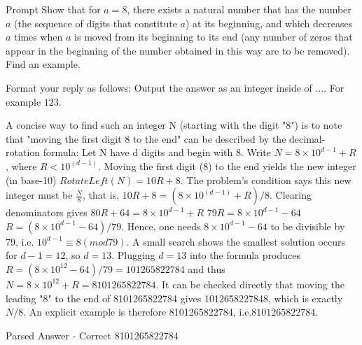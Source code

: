 
\begin{prompt}{Prompt}
Show that for $a=8$, there exists a natural number that has the number $a$ (the sequence of digits that constitute $a$) at its beginning, and which decreases $a$ times when $a$ is moved from its beginning to its end (any number of zeros that appear in the beginning of the number obtained in this way are to be removed). Find an example.

Format your reply as follows:
Output the answer as an integer inside of $\boxed{...}$. For example $\boxed{123}$.
\end{prompt}

\begingroup\raggedleft
\begin{gpt}{\ooneheader}
A concise way to find such an integer N (starting with the digit "8") is to note that "moving the first digit 8 to the end" can be described by the decimal-rotation formula:
Let N have d digits and begin with 8. Write $N = 8\times10^{d-1} + R$, where $R < 10^(d-1)$.
Moving the first digit (8) to the end yields the new integer (in base-10)  \n  $RotateLeft(N) = 10R + 8$. The problem's condition says this new integer must be $\frac{N}{8}$, that is, $10R + 8 = (8\times 10^(d-1) + R) / 8$. Clearing denominators gives   $80R + 64 = 8\times 10^{d-1} + R$  
$79R = 8\times 10^{d-1} - 64$  
$R = (8\times10^{d-1} - 64) / 79$.
Hence, one needs $8\times 10^{d-1} - 64$ to be divisible by 79, i.e. $10^{d-1} \equiv 8 (mod 79)$.  A small search shows the smallest solution occurs for $d-1 = 12$, so $d = 13$.  Plugging $d = 13$ into the formula produces $R = (8\times 10^{12} - 64) / 79 = 101265822784$ and thus $N = 8\times 10^{12}+ R = 8101265822784$. It can be checked directly that moving the leading "8" to the end of 8101265822784 gives 1012658227848, which is exactly $N/8$.  An explicit example is therefore 8101265822784, i.e.$\boxed{8101265822784}$.
\end{gpt}
\endgroup

\begin{parsecheckcorrect}{Parsed Answer - Correct}
8101265822784
\end{parsecheckcorrect}
